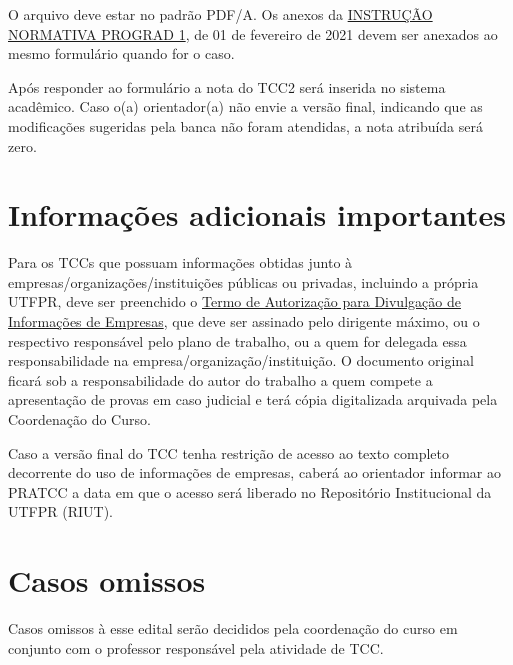\documentclass[a4paper, 12pt]{article}
\begin{document}
	O arquivo deve estar no padrão PDF/A. Os anexos da \href{https://sei.utfpr.edu.br/sei/publicacoes/controlador_publicacoes.php?acao=publicacao_visualizar&id_documento=2042165&id_orgao_publicacao=0}{INSTRUÇÃO NORMATIVA PROGRAD 1}, de 01 de fevereiro de 2021 devem ser anexados ao mesmo formulário quando for o caso. 
		
	Após responder ao formulário a nota do TCC2 será inserida no sistema acadêmico. Caso o(a) orientador(a) não envie a versão final, indicando que as modificações sugeridas pela banca não foram atendidas, a nota atribuída será zero.	
		
	\section{Informações adicionais importantes}
	
	Para os TCCs que possuam informações obtidas junto à empresas/organizações/instituições públicas ou privadas, incluindo a própria UTFPR, deve ser preenchido o \href{https://sei.utfpr.edu.br/sei/publicacoes/controlador_publicacoes.php?acao=publicacao_visualizar&id_documento=2651593&id_orgao_publicacao=0}{Termo de Autorização para Divulgação de Informações de Empresas}, que deve ser assinado pelo dirigente máximo, ou o respectivo responsável pelo plano de trabalho, ou a quem for delegada essa responsabilidade na empresa/organização/instituição. O documento original ficará sob a responsabilidade do autor do trabalho a quem compete a apresentação de provas em caso judicial e terá cópia digitalizada arquivada pela Coordenação do Curso.

	Caso a versão final do TCC tenha restrição de acesso ao texto completo decorrente do uso de informações de empresas, caberá ao orientador informar ao PRATCC a data em que o acesso será liberado no Repositório Institucional da UTFPR (RIUT).
	
	
	\section{Casos omissos}
	
	Casos omissos à esse edital serão decididos pela coordenação do curso em conjunto com o professor responsável pela atividade de TCC.
\end{document}
